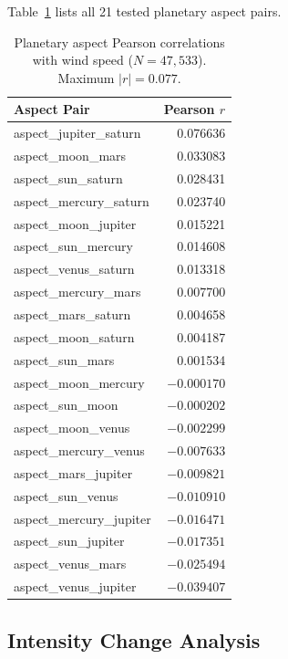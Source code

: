 \documentclass[12pt,a4paper]{article}
\begin{document}
Table~\ref{tab:aspects} lists all 21 tested planetary aspect pairs.

\begin{table}[H]
  \centering
  \caption{Planetary aspect Pearson correlations with wind speed
  ($N = 47{,}533$). Maximum $|r| = 0.077$.}
  \label{tab:aspects}
  \begin{tabular}{lr}
    \toprule
    Aspect Pair & Pearson $r$ \\
    \midrule
    aspect\_jupiter\_saturn  &  0.076636 \\
    aspect\_moon\_mars       &  0.033083 \\
    aspect\_sun\_saturn      &  0.028431 \\
    aspect\_mercury\_saturn  &  0.023740 \\
    aspect\_moon\_jupiter    &  0.015221 \\
    aspect\_sun\_mercury     &  0.014608 \\
    aspect\_venus\_saturn    &  0.013318 \\
    aspect\_mercury\_mars    &  0.007700 \\
    aspect\_mars\_saturn     &  0.004658 \\
    aspect\_moon\_saturn     &  0.004187 \\
    aspect\_sun\_mars        &  0.001534 \\
    aspect\_moon\_mercury    & $-0.000170$ \\
    aspect\_sun\_moon        & $-0.000202$ \\
    aspect\_moon\_venus      & $-0.002299$ \\
    aspect\_mercury\_venus   & $-0.007633$ \\
    aspect\_mars\_jupiter    & $-0.009821$ \\
    aspect\_sun\_venus       & $-0.010910$ \\
    aspect\_mercury\_jupiter & $-0.016471$ \\
    aspect\_sun\_jupiter     & $-0.017351$ \\
    aspect\_venus\_mars      & $-0.025494$ \\
    aspect\_venus\_jupiter   & $-0.039407$ \\
    \bottomrule
  \end{tabular}
\end{table}

\subsection{Intensity Change Analysis}
\end{document}
